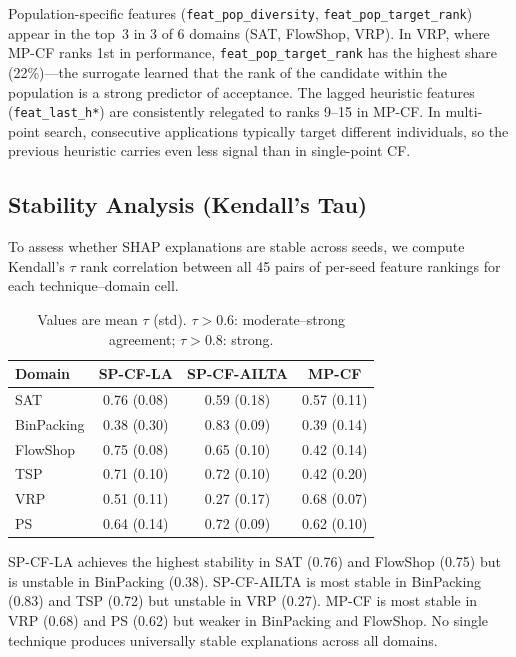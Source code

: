 \documentclass[11pt,a4paper]{article}
\begin{document}
Population-specific features (\texttt{feat\_pop\_diversity},
\texttt{feat\_pop\_target\_rank}) appear in the top~3 in 3 of 6 domains
(SAT, FlowShop, VRP). In VRP, where MP-CF ranks 1st in performance,
\texttt{feat\_pop\_target\_rank} has the highest share (22\%)---the surrogate
learned that the rank of the candidate within the population is a strong predictor
of acceptance. The lagged heuristic features (\texttt{feat\_last\_h*}) are consistently
relegated to ranks 9--15 in MP-CF\@. In multi-point search, consecutive
applications typically target different individuals, so the previous
heuristic carries even less signal than in single-point CF\@.

\subsection{Stability Analysis (Kendall's Tau)}

To assess whether SHAP explanations are stable across seeds, we compute Kendall's
$\tau$ rank correlation between all 45 pairs of per-seed feature rankings for each
technique--domain cell.

\begin{table}[H]
\centering
\begin{tabular}{lccc}
\toprule
Domain & SP-CF-LA & SP-CF-AILTA & MP-CF \\
\midrule
SAT & 0.76 (0.08) & 0.59 (0.18) & 0.57 (0.11) \\
BinPacking & 0.38 (0.30) & 0.83 (0.09) & 0.39 (0.14) \\
FlowShop & 0.75 (0.08) & 0.65 (0.10) & 0.42 (0.14) \\
TSP & 0.71 (0.10) & 0.72 (0.10) & 0.42 (0.20) \\
VRP & 0.51 (0.11) & 0.27 (0.17) & 0.68 (0.07) \\
PS & 0.64 (0.14) & 0.72 (0.09) & 0.62 (0.10) \\
\bottomrule
\end{tabular}
\caption*{Values are mean $\tau$ (std). $\tau > 0.6$: moderate--strong agreement; $\tau > 0.8$: strong.}
\end{table}

SP-CF-LA achieves the highest stability in SAT (0.76) and FlowShop (0.75) but is
unstable in BinPacking (0.38). SP-CF-AILTA is most stable in BinPacking (0.83) and
TSP (0.72) but unstable in VRP (0.27). MP-CF is most stable in VRP (0.68) and PS
(0.62) but weaker in BinPacking and FlowShop. No single technique produces
universally stable explanations across all domains.
\end{document}
